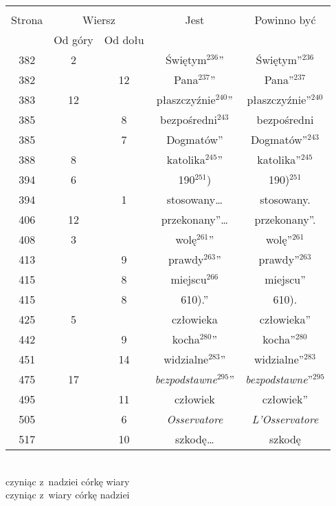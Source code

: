 \documentclass[a4paper,11pt]{article}
\begin{document}
\begin{center}
  \begin{tabular}{|c|c|c|c|c|}
    \hline
    & \multicolumn{2}{c|}{} & & \\
    Strona & \multicolumn{2}{c|}{Wiersz} & Jest
                              & Powinno być \\ \cline{2-3}
    & Od góry & Od dołu & & \\
    \hline
    382 &  2 & & Świętym$^{ 236 }$” & Świętym”$^{ 236 }$ \\
    382 & & 12 & Pana$^{ 237 }$” & Pana”$^{ 237 }$ \\
    383 & 12 & & płaszczyźnie$^{ 240 }$” & płaszczyźnie”$^{ 240 }$ \\
    385 & &  8 & bezpośredni$^{ 243 }$ & bezpośredni \\
    385 & &  7 & Dogmatów” & Dogmatów”$^{ 243 }$ \\
    388 &  8 & & katolika$^{ 245 }$” & katolika”$^{ 245 }$ \\
    394 &  6 & & 190$^{ 251 }$) & 190)$^{ 251 }$ \\
    394 & &  1 & stosowany\ldots & stosowany. \\
    406 & 12 & & przekonany”\ldots & przekonany”. \\
    408 &  3 & & wolę$^{ 261 }$” & wolę”$^{ 261 }$ \\
    413 & &  9 & prawdy$^{ 263 }$” & prawdy”$^{ 263 }$ \\
    415 & &  8 & miejscu$^{ 266 }$ & miejscu” \\
    415 & &  8 & 610).” & 610). \\
    425 &  5 & & człowieka & człowieka” \\
    442 & &  9 & kocha$^{ 280 }$” & kocha”$^{ 280 }$ \\
    451 & & 14 & widzialne$^{ 283 }$” & widzialne”$^{ 283 }$ \\
    475 & 17 & & \emph{bezpodstawne}$^{ 295 }$”
           & \emph{bezpodstawne}”$^{ 295 }$ \\
    495 & & 11 & człowiek & człowiek” \\
    505 & &  6 & \emph{Osservatore} & \emph{L'Osservatore} \\
    517 & & 10 & szkodę\ldots & szkodę \\
    \hline
  \end{tabular}

\end{center}
\noindent
{} \\
\Jest  czyniąc z~nadziei córkę wiary \\
\Powin czyniąc z~wiary córkę nadziei \\
\end{document}
